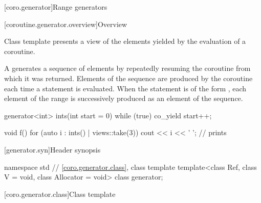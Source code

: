 [coro.generator]{Range generators}

[coroutine.generator.overview]{Overview}

\pnum
Class template  presents
a view of the elements yielded by the evaluation of a coroutine.

\pnum
A  generates a sequence of elements by
repeatedly resuming the coroutine from which it was returned.
Elements of the sequence are produced by the coroutine
each time a  statement is evaluated.
When the  statement is of the form
,
each element of the range 
is successively produced as an element of the sequence.
\begin{example}
\begin{codeblock}
generator<int> ints(int start = 0) {
  while (true)
    co_yield start++;
}

void f() {
  for (auto i : ints() | views::take(3))
    cout << i << ' ';       // prints 
}
\end{codeblock}
\end{example}

[generator.syn]{Header  synopsis}

%
\begin{codeblock}
namespace std {
  // \ref{coro.generator.class}, class template 
  template<class Ref, class V = void, class Allocator = void>
    class generator;
}
\end{codeblock}

[coro.generator.class]{Class template }

